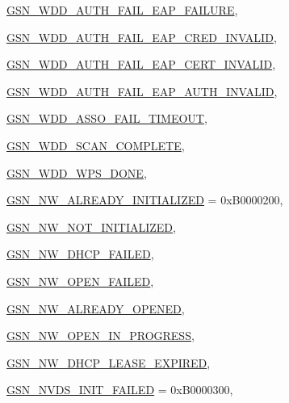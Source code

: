 \begin{DoxyCompactItemize}
\par
\hyperlink{a00659_gga476ae1caf992f8287176b2cc414c8707a561bc7dacb093e9b39e76202a5ca8dba}{GSN\_\-WDD\_\-AUTH\_\-FAIL\_\-EAP\_\-FAILURE}, 
\par
\hyperlink{a00659_gga476ae1caf992f8287176b2cc414c8707ad61ac3fa7b748e9c982067f14b4c2e65}{GSN\_\-WDD\_\-AUTH\_\-FAIL\_\-EAP\_\-CRED\_\-INVALID}, 
\par
\hyperlink{a00659_gga476ae1caf992f8287176b2cc414c8707a5493fe620f8cceca33e723f17861edba}{GSN\_\-WDD\_\-AUTH\_\-FAIL\_\-EAP\_\-CERT\_\-INVALID}, 
\par
\hyperlink{a00659_gga476ae1caf992f8287176b2cc414c8707aa99c07bc1b6c819f5e04398362953e04}{GSN\_\-WDD\_\-AUTH\_\-FAIL\_\-EAP\_\-AUTH\_\-INVALID}, 
\par
\hyperlink{a00659_gga476ae1caf992f8287176b2cc414c8707a83eebf46865ac5391ca2921f09413e30}{GSN\_\-WDD\_\-ASSO\_\-FAIL\_\-TIMEOUT}, 
\par
\hyperlink{a00659_gga476ae1caf992f8287176b2cc414c8707a094706054ce496aaf5f6da26f7e36541}{GSN\_\-WDD\_\-SCAN\_\-COMPLETE}, 
\par
\hyperlink{a00659_gga476ae1caf992f8287176b2cc414c8707a68971dcaaef7eb226b006bf237b2bdda}{GSN\_\-WDD\_\-WPS\_\-DONE}, 
\par
\hyperlink{a00659_gga476ae1caf992f8287176b2cc414c8707a555a8446aac8b73d3b85c8bb4e9bc61c}{GSN\_\-NW\_\-ALREADY\_\-INITIALIZED} =  0xB0000200, 
\par
\hyperlink{a00659_gga476ae1caf992f8287176b2cc414c8707a64abcaf92b3dbbaede3601f2f22d9220}{GSN\_\-NW\_\-NOT\_\-INITIALIZED}, 
\par
\hyperlink{a00659_gga476ae1caf992f8287176b2cc414c8707ab3e49950d09ad8831823af935dafba4a}{GSN\_\-NW\_\-DHCP\_\-FAILED}, 
\par
\hyperlink{a00659_gga476ae1caf992f8287176b2cc414c8707a789dbdb3fc16ca9b3c90480b91459283}{GSN\_\-NW\_\-OPEN\_\-FAILED}, 
\par
\hyperlink{a00659_gga476ae1caf992f8287176b2cc414c8707a42bbbe92fc85a0baefb07f63f1c392bb}{GSN\_\-NW\_\-ALREADY\_\-OPENED}, 
\par
\hyperlink{a00659_gga476ae1caf992f8287176b2cc414c8707aa1061f5002a7468c6dcae80272b26b64}{GSN\_\-NW\_\-OPEN\_\-IN\_\-PROGRESS}, 
\par
\hyperlink{a00659_gga476ae1caf992f8287176b2cc414c8707a2f544f63345dfce84cc353c6155f9eca}{GSN\_\-NW\_\-DHCP\_\-LEASE\_\-EXPIRED}, 
\par
\hyperlink{a00659_gga476ae1caf992f8287176b2cc414c8707ac559e6ea3217b9084e13b8191ef71163}{GSN\_\-NVDS\_\-INIT\_\-FAILED} =  0xB0000300, 

\end{DoxyCompactItemize}
